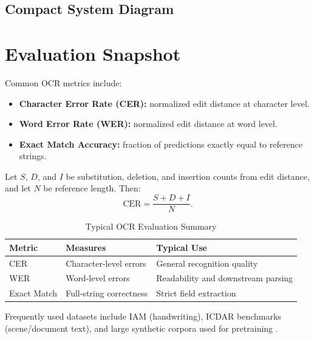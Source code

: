 \documentclass[11pt]{article}
\begin{document}
\subsection{Compact System Diagram}
\begin{center}
\end{center}

\section{Evaluation Snapshot}
Common OCR metrics include:
\begin{itemize}[leftmargin=*]
    \item \textbf{Character Error Rate (CER):} normalized edit distance at character level.
    \item \textbf{Word Error Rate (WER):} normalized edit distance at word level.
    \item \textbf{Exact Match Accuracy:} fraction of predictions exactly equal to reference strings.
\end{itemize}

Let $S$, $D$, and $I$ be substitution, deletion, and insertion counts from edit distance, and let $N$ be reference length. Then:
\[
\text{CER} = \frac{S + D + I}{N}.
\]

\begin{table}[h]
\centering
\caption{Typical OCR Evaluation Summary}
\begin{tabular}{@{}lll@{}}
\toprule
Metric & Measures & Typical Use \\
\midrule
CER & Character-level errors & General recognition quality \\
WER & Word-level errors & Readability and downstream parsing \\
Exact Match & Full-string correctness & Strict field extraction \\
\bottomrule
\end{tabular}
\end{table}

Frequently used datasets include IAM (handwriting), ICDAR benchmarks (scene/document text), and large synthetic corpora used for pretraining \cite{baek2019str,li2021trba}.
\end{document}
